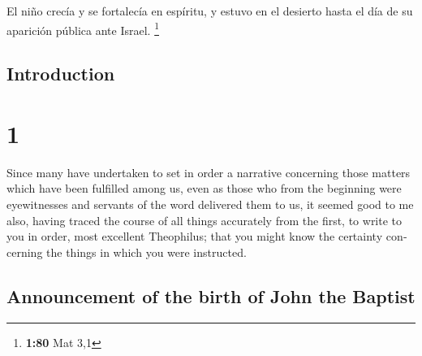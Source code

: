 \begin{paracol}{2}
 El niño crecía y se fortalecía en espíritu, y estuvo en
el desierto hasta el día de su aparición pública ante Israel.
\footnote{\textbf{1:80} Mat 3,1}

\switchcolumn
\begin{otherlanguage}{english}

\hypertarget{introduction}{%
\subsection{Introduction}\label{introduction}}

\hypertarget{section-1}{%
\section{1}\label{section-1}}

 Since many have undertaken to set in order a narrative
concerning those matters which have been fulfilled among us,
 even as those who from the beginning were eyewitnesses
and servants of the word delivered them to us,  it seemed
good to me also, having traced the course of all things accurately from
the first, to write to you in order, most excellent Theophilus;
 that you might know the certainty concerning the things
in which you were instructed.

\hypertarget{announcement-of-the-birth-of-john-the-baptist}{%
\subsection{Announcement of the birth of John the
Baptist}\label{announcement-of-the-birth-of-john-the-baptist}}


\end{otherlanguage}
\end{paracol}
